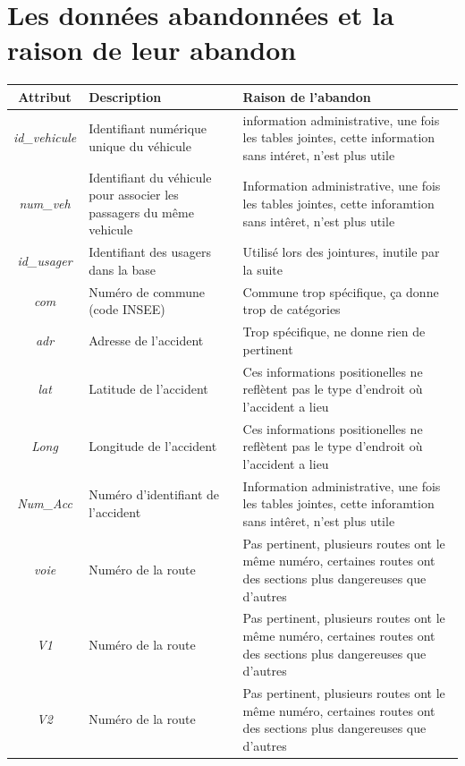 \documentclass{article}
\begin{document}
    \section{Les données abandonnées et la raison de leur abandon}\label{appendix:dataset}
    \begin{center}
        \scriptsize
        \begin{tabular}{ |c|p{3.5cm}|p{7cm}| }
            \hline
            \textbf{Attribut} & \textbf{Description} & \textbf{Raison de l'abandon} \\
            \hline
            \textit{id\_vehicule} & Identifiant numérique unique du véhicule & information administrative, une fois les tables jointes, cette information sans intéret, n'est plus utile\\
            \textit{num\_veh} & Identifiant du véhicule pour associer les passagers du même vehicule & Information administrative, une fois les tables jointes, cette inforamtion sans intêret, n'est plus utile\\
            \textit{id\_usager} & Identifiant des usagers dans la base & Utilisé lors des jointures, inutile par la suite\\
            \textit{com} & Numéro de commune (code INSEE) & Commune trop spécifique, ça donne trop de catégories\\
            \textit{adr} & Adresse de l'accident & Trop spécifique, ne donne rien de pertinent\\
            \textit{lat} & Latitude de l'accident & Ces informations positionelles ne reflètent pas le type d'endroit où l'accident a lieu\\
            \textit{Long} & Longitude de l'accident & Ces informations positionelles ne reflètent pas le type d'endroit où l'accident a lieu\\
            \textit{Num\_Acc} & Numéro d'identifiant de l'accident & Information administrative, une fois les tables jointes, cette inforamtion sans intêret, n'est plus utile\\
            \textit{voie} & Numéro de la route & Pas pertinent, plusieurs routes ont le même numéro, certaines routes ont des sections plus dangereuses que d'autres\\
            \textit{V1} & Numéro de la route & Pas pertinent, plusieurs routes ont le même numéro, certaines routes ont des sections plus dangereuses que d'autres\\
            \textit{V2} & Numéro de la route & Pas pertinent, plusieurs routes ont le même numéro, certaines routes ont des sections plus dangereuses que d'autres\\

\end{tabular}
\end{center}
\end{document}
